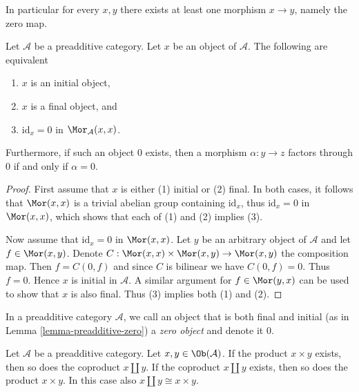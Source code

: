 \noindent
In particular for every $x, y$ there exists at least
one morphism $x \to y$, namely the zero map.

\begin{lemma}
\label{lemma-preadditive-zero}
Let $\mathcal{A}$ be a preadditive category.
Let $x$ be an object of $\mathcal{A}$.
The following are equivalent
\begin{enumerate}
\item $x$ is an initial object,
\item $x$ is a final object, and
\item $\text{id}_x = 0$ in $\Mor_\mathcal{A}(x, x)$.
\end{enumerate}
Furthermore, if such an object $0$ exists, then a morphism
$\alpha : y \to z$ factors through $0$ if and only if $\alpha = 0$.
\end{lemma}

\begin{proof}
First assume that $x$ is either (1) initial or (2) final.
In both cases, it follows that $\Mor(x,x)$ is a trivial abelian group
containing $\text{id}_x$, thus $\text{id}_x = 0$ in
$\Mor(x, x)$, which shows that each of (1) and (2) implies (3).

\medskip\noindent
Now assume that $\text{id}_x = 0$ in $\Mor(x,x)$. Let $y$
be an arbitrary object of $\mathcal{A}$ and let $f \in \Mor(x ,y)$.
Denote $C : \Mor(x,x) \times \Mor(x,y) \to \Mor(x,y)$ the composition map.
Then $f = C(0, f)$ and since $C$ is bilinear we have $C(0, f) = 0$.
Thus $f = 0$. Hence $x$ is initial in $\mathcal{A}$.
A similar argument for $f \in \Mor(y, x)$ can be used to show that
$x$ is also final. Thus (3) implies both (1) and (2).
\end{proof}

\begin{definition}
\label{definition-zero-object}
In a preadditive category $\mathcal{A}$, we call an object that is both
final and initial (as in Lemma \ref{lemma-preadditive-zero}) a
{\it zero object} and denote it $0$.
\end{definition}

\begin{lemma}
\label{lemma-preadditive-direct-sum}
Let $\mathcal{A}$ be a preadditive category.
Let $x, y \in \Ob(\mathcal{A})$.
If the product $x \times y$ exists, then so does
the coproduct $x \amalg y$.
If the coproduct $x \amalg y$ exists, then so does
the product $x \times y$. In this case
also $x \amalg y \cong x \times y$.
\end{lemma}

